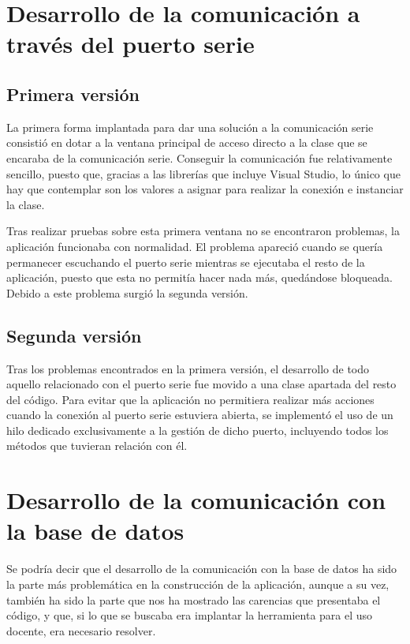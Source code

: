 \section{Desarrollo de la comunicación a través del puerto serie}

\subsection{Primera versión}

La primera forma implantada para dar una solución a la comunicación serie consistió en dotar a la ventana principal de acceso directo a la clase que se encaraba de la comunicación serie. Conseguir la comunicación fue relativamente sencillo, puesto que, gracias a las librerías que incluye Visual Studio, lo único que hay que contemplar son los valores a asignar para realizar la conexión e instanciar la clase.

Tras realizar pruebas sobre esta primera ventana no se encontraron problemas, la aplicación funcionaba con normalidad. El problema apareció cuando se quería permanecer escuchando el puerto serie mientras se ejecutaba el resto de la aplicación, puesto que esta no permitía hacer nada más, quedándose bloqueada. Debido a este problema surgió la segunda versión.

\subsection{Segunda versión}

Tras los problemas encontrados en la primera versión, el desarrollo de todo aquello relacionado con el puerto serie fue movido a una clase apartada del resto del código. Para evitar que la aplicación no permitiera realizar más acciones cuando la conexión al puerto serie estuviera abierta, se implementó el uso de un hilo dedicado exclusivamente a la gestión de dicho puerto, incluyendo todos los métodos que tuvieran relación con él.

\section{Desarrollo de la comunicación con la base de datos}

Se podría decir que el desarrollo de la comunicación con la base de datos ha sido la parte más problemática en la construcción de la aplicación, aunque a su vez, también ha sido la parte que nos ha mostrado las carencias que presentaba el código, y que, si lo que se buscaba era implantar la herramienta para el uso docente, era necesario resolver.

